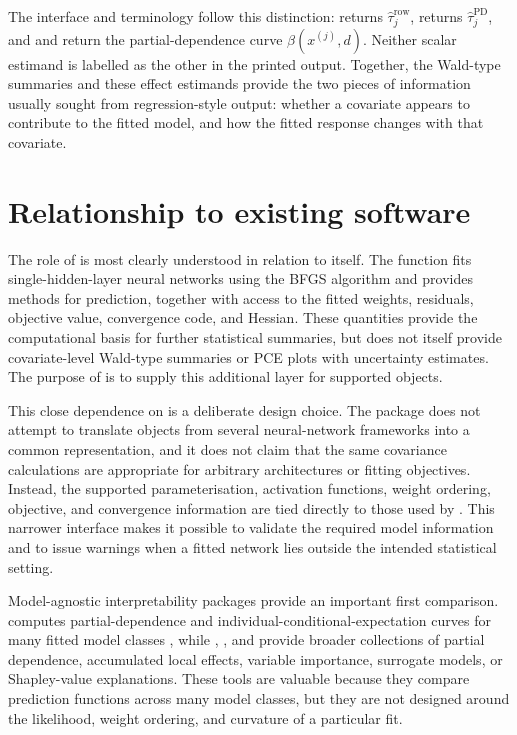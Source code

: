 The interface and terminology follow this distinction:  returns \(\hat{\tau}^{\mathrm{row}}_j\),  returns \(\hat{\tau}^{\mathrm{PD}}_j\), and  and  return the partial-dependence curve \(\hat{\beta}(x^{(j)}, d)\).
Neither scalar estimand is labelled as the other in the printed output.
Together, the Wald-type summaries and these effect estimands provide the two pieces of information usually sought from regression-style output: whether a covariate appears to contribute to the fitted model, and how the fitted response changes with that covariate.

\section{Relationship to existing software}\label{sec:software}

The role of  is most clearly understood in relation to  itself.
The  function fits single-hidden-layer neural networks using the BFGS algorithm and provides methods for prediction, together with access to the fitted weights, residuals, objective value, convergence code, and Hessian.
These quantities provide the computational basis for further statistical summaries, but  does not itself provide covariate-level Wald-type summaries or PCE plots with uncertainty estimates.
The purpose of  is to supply this additional layer for supported  objects.

This close dependence on  is a deliberate design choice.
The package does not attempt to translate objects from several neural-network frameworks into a common representation, and it does not claim that the same covariance calculations are appropriate for arbitrary architectures or fitting objectives.
Instead, the supported parameterisation, activation functions, weight ordering, objective, and convergence information are tied directly to those used by .
This narrower interface makes it possible to validate the required model information and to issue warnings when a fitted network lies outside the intended statistical setting.

Model-agnostic interpretability packages provide an important first comparison.
 computes partial-dependence and individual-conditional-expectation curves for many fitted model classes \citep{pdp}, while  \citep{iml},  \citep{DALEX}, and  \citep{vip} provide broader collections of partial dependence, accumulated local effects, variable importance, surrogate models, or Shapley-value explanations.
These tools are valuable because they compare prediction functions across many model classes, but they are not designed around the likelihood, weight ordering, and curvature of a particular  fit.

